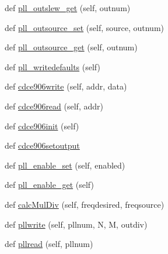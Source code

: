 \begin{DoxyCompactItemize}
\item 
def \hyperlink{classsoftware_1_1chipwhisperer_1_1hardware_1_1naeusb_1_1pll__cdce906_1_1PLLCDCE906_a2c965321e027fa471257edd0c8f804cb}{pll\+\_\+outslew\+\_\+get} (self, outnum)
\item 
def \hyperlink{classsoftware_1_1chipwhisperer_1_1hardware_1_1naeusb_1_1pll__cdce906_1_1PLLCDCE906_a0d0d1b495d4c82c12a5674854141eae8}{pll\+\_\+outsource\+\_\+set} (self, source, outnum)
\item 
def \hyperlink{classsoftware_1_1chipwhisperer_1_1hardware_1_1naeusb_1_1pll__cdce906_1_1PLLCDCE906_adc8b004b6a40ed017a7d9a4f35ca3957}{pll\+\_\+outsource\+\_\+get} (self, outnum)
\item 
def \hyperlink{classsoftware_1_1chipwhisperer_1_1hardware_1_1naeusb_1_1pll__cdce906_1_1PLLCDCE906_a7db25d516e3f425f13b2b57f11c9aa3d}{pll\+\_\+writedefaults} (self)
\item 
def \hyperlink{classsoftware_1_1chipwhisperer_1_1hardware_1_1naeusb_1_1pll__cdce906_1_1PLLCDCE906_a29165d60f9a6bae699dbf0022c3ed6d3}{cdce906write} (self, addr, data)
\item 
def \hyperlink{classsoftware_1_1chipwhisperer_1_1hardware_1_1naeusb_1_1pll__cdce906_1_1PLLCDCE906_a0fc35778fb0ba2a4a31fdeb4b55810ef}{cdce906read} (self, addr)
\item 
def \hyperlink{classsoftware_1_1chipwhisperer_1_1hardware_1_1naeusb_1_1pll__cdce906_1_1PLLCDCE906_ad93f5be1ef1c29f8c311cc7523bef531}{cdce906init} (self)
\item 
def \hyperlink{classsoftware_1_1chipwhisperer_1_1hardware_1_1naeusb_1_1pll__cdce906_1_1PLLCDCE906_a4f13e5a638ded665eb7a89944801d0e6}{cdce906setoutput}
\item 
def \hyperlink{classsoftware_1_1chipwhisperer_1_1hardware_1_1naeusb_1_1pll__cdce906_1_1PLLCDCE906_adb4c50597eb59df695f498b359aa6fa1}{pll\+\_\+enable\+\_\+set} (self, enabled)
\item 
def \hyperlink{classsoftware_1_1chipwhisperer_1_1hardware_1_1naeusb_1_1pll__cdce906_1_1PLLCDCE906_a4300a52624da3004c93dee2658afb60d}{pll\+\_\+enable\+\_\+get} (self)
\item 
def \hyperlink{classsoftware_1_1chipwhisperer_1_1hardware_1_1naeusb_1_1pll__cdce906_1_1PLLCDCE906_a456e5bbbaac70a6a43f915a5e47f4cbe}{calc\+Mul\+Div} (self, freqdesired, freqsource)
\item 
def \hyperlink{classsoftware_1_1chipwhisperer_1_1hardware_1_1naeusb_1_1pll__cdce906_1_1PLLCDCE906_a763a20607e203267d6cc29be1c5b762d}{pllwrite} (self, pllnum, N, M, outdiv)
\item 
def \hyperlink{classsoftware_1_1chipwhisperer_1_1hardware_1_1naeusb_1_1pll__cdce906_1_1PLLCDCE906_ae77980d9567777a9382b316e84d6af9d}{pllread} (self, pllnum)
\end{DoxyCompactItemize}
